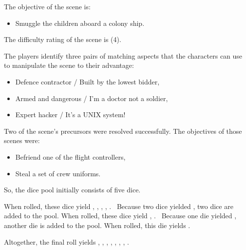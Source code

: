 \documentclass[12pt, a5paper, parskip=half-]{scrartcl}
\begin{document}
The objective of the scene is:
\begin{itemize}[leftmargin=\widthof{\hspace{0.25cm}\textbullet\space}, noitemsep,topsep=-1ex]
\item Smuggle the children aboard a colony ship.
\end{itemize}
\vspace{1ex}
The difficulty rating of the scene is (4). 

The players identify three pairs of matching aspects that the characters can use to manipulate the scene to their advantage:
\begin{itemize}[leftmargin=\widthof{\hspace{0.25cm}\textbullet\space}, noitemsep, topsep=-1ex]
\item Defence contractor / Built by the lowest bidder,
\item Armed and dangerous / I'm a doctor not a soldier,
\item Expert hacker / It's a UNIX system!
\end{itemize}
\vspace{1ex}
Two of the scene's precursors were resolved successfully. The objectives of those scenes were:
\begin{itemize}[leftmargin=\widthof{\hspace{0.25cm}\textbullet\space}, nosep, topsep=-1ex]
\item Befriend one of the flight controllers,
\item Steal a set of crew uniforms.
\end{itemize}
\vspace{1ex}
So, the dice pool initially consists of five dice.

When rolled, these dice yield , , , ,  .%
\ Because two dice yielded , two dice are added to the pool.
When rolled, these dice yield , .%
\ Because one die yielded , another die is added to the pool.
When rolled, this die yields .

Altogether, the final roll yields , , , , , , , .%
\end{document}
